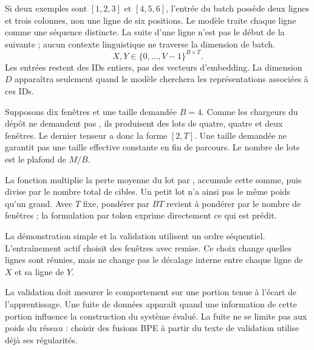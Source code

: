 Si deux exemples sont \([1,2,3]\) et \([4,5,6]\), l'entrée du batch
possède deux lignes et trois colonnes, non une ligne de six positions.
Le modèle traite chaque ligne comme une séquence distincte.
La suite d'une ligne n'est pas le début de la suivante ; aucun contexte
linguistique ne traverse la dimension de batch.
\[
    X,Y\in\{0,\ldots,V-1\}^{B\times T}.
\]
Les entrées restent des IDs entiers, pas des vecteurs d'embedding.
La dimension \(D\) apparaîtra seulement quand le modèle cherchera les
représentations associées à ces IDs.

Supposons dix fenêtres et une taille demandée \(B=4\).
Comme les chargeurs du dépôt ne demandent pas ,
ils produisent des lots de quatre, quatre et deux fenêtres.
Le dernier tenseur a donc la forme \([2,T]\). Une taille demandée ne
garantit pas une taille effective constante en fin de parcours.
Le nombre de lots est le plafond de \(M/B\).

La fonction  multiplie la perte moyenne du lot par
, accumule cette somme, puis divise par le nombre total
de cibles. Un petit lot n'a ainsi pas le même poids qu'un grand.
Avec \(T\) fixe, pondérer par \(BT\) revient à pondérer par le nombre
de fenêtres ; la formulation par token exprime directement ce qui est prédit.

La démonstration simple et la validation utilisent un ordre séquentiel.
L'entraînement actif choisit des fenêtres avec remise. Ce choix change
quelles lignes sont réunies, mais ne change pas le décalage interne entre
chaque ligne de \(X\) et sa ligne de \(Y\).


La validation doit mesurer le comportement sur une portion tenue à l'écart
de l'apprentissage. Une fuite de données apparaît quand une information
de cette portion influence la construction du système évalué.
La fuite ne se limite pas aux poids du réseau : choisir des fusions BPE
à partir du texte de validation utilise déjà ses régularités.

